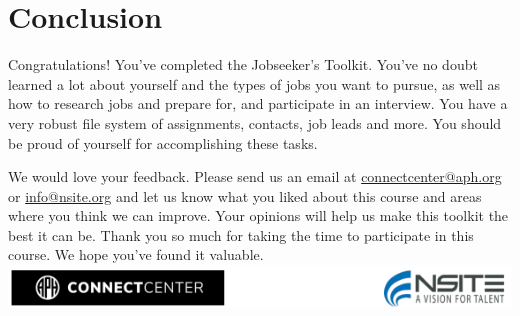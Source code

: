 \hypertarget{conclusion}{}\chapter*{Conclusion}\label{conclusion}

\noindent\makebox[\linewidth]{\rule{\linewidth}{0.4pt}}

Congratulations! You've completed the Jobseeker's Toolkit. You've no doubt learned a lot about yourself and the types of jobs you want to pursue, as well as how to research jobs and prepare for, and participate in an interview. You have a very robust file system of assignments, contacts, job leads and more. You should be proud of yourself for accomplishing these tasks.

We would love your feedback. Please send us an email at \href{mailto:connectcenter@aph.org}{connectcenter@aph.org} or \href{mailto:info@nsite.org}{info@nsite.org} and let us know what you liked about this course and areas where you think we can improve. Your opinions will help us make this toolkit the best it can be. Thank you so much for taking the time to participate in this course. We hope you've found it valuable.
\vfill
\includegraphics[width=1\linewidth]{branding.png}
